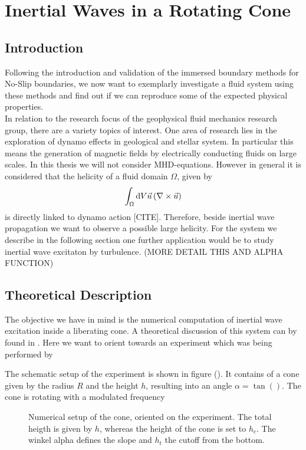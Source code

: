 \chapter{Inertial Waves in a Rotating Cone}

\section{Introduction}

Following the introduction and validation of the immersed boundary methods for No-Slip boundaries,
we now want to exemplarly investigate a fluid system using these methods
and find out if we can reproduce some of the expected physical properties.\\
In relation to the research focus of the geophysical fluid mechanics research group, there are a variety
topics of interest.
One area of research lies in the exploration of dynamo effects in geological and stellar system.
In particular this means the generation of magnetic fields by electrically conducting fluids on large scales.
In this thesis we will not consider MHD-equations.
However in general it is considered that the helicity of a fluid domain $\Omega$, given by
\begin{align}
    \int_{\Omega}\mathop{}\!\mathrm{d} V  \vec{u} \left( \nabla \times \vec{u} \right)
\end{align}
is directly linked to dynamo action [CITE].
Therefore, beside inertial wave propagation we want to observe a possible large helicity.
For the system we describe in the following section one further application
would be to study inertial wave excitaton by turbulence. (MORE DETAIL THIS AND ALPHA FUNCTION)

\section{Theoretical Description}

The objective we have in mind is the numerical computation of inertial wave excitation inside a liberating cone.
A theoretical discussion of this system  can by found in \citep{GREENSPAN}.
Here we want to orient towards an experiment which was being performed by \citep{Beardsley1970}

The schematic setup of the experiment is shown in figure ().
It contains of a cone given by the radius $R$ and the height $h$, resulting into an angle $\alpha = \tan()$.
The cone is rotating with a modulated frequency

\begin{figure}[!bp]
  \begin{minipage}[c]{0.6\textwidth}
      \centering
  \end{minipage}
  \begin{minipage}[c]{0.3\textwidth}
      \caption{Numerical setup of the cone, oriented on the experiment. The total heigth is given by $h$, whereas the height of the cone is set to $h_c$.
      The winkel alpha defines the slope and $h_t$ the cutoff from the bottom.}
      \label{cone:theorie}
  \end{minipage}
\end{figure}


